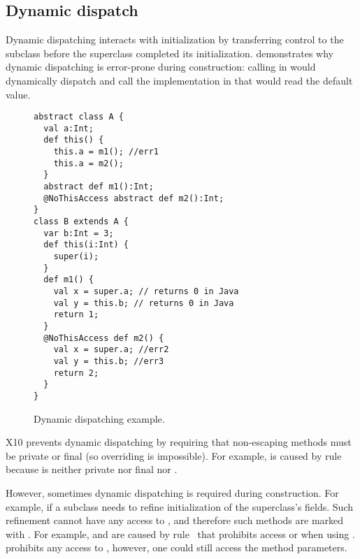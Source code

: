 \subsection{Dynamic dispatch}
Dynamic dispatching interacts with initialization by transferring control to the subclass
    before the superclass completed its initialization.
 demonstrates why dynamic dispatching is error-prone during construction:
    calling  in  would dynamically dispatch and
    call the implementation in 
    that would read the default value.



\begin{figure}
\begin{lstlisting}
abstract class A {
  val a:Int;
  def this() {
    this.a = m1(); //err1
    this.a = m2();
  }
  abstract def m1():Int;
  @NoThisAccess abstract def m2():Int;
}
class B extends A {
  var b:Int = 3;
  def this(i:Int) {
    super(i);
  }
  def m1() {
    val x = super.a; // returns 0 in Java
    val y = this.b; // returns 0 in Java
    return 1;
  }
  @NoThisAccess def m2() {
    val x = super.a; //err2
    val y = this.b; //err3
    return 2;
  }
}
\end{lstlisting}
\caption{Dynamic dispatching example.
    }
\label{Figure:Dynamic-dispatch}
\end{figure}


X10 prevents dynamic dispatching by requiring that non-escaping methods
    must be private or final
    (so overriding is impossible).
For example,  is caused by rule~
    because  is neither private nor final nor .

However, sometimes dynamic dispatching is required during construction.
For example, if a subclass needs to refine initialization
    of the superclass's fields.
Such refinement cannot have any access to \this, and therefore
    such methods are marked with .
For example,  and  are caused by rule~ that prohibits access \this or 
    when using .
 prohibits any access to \this,
    however, one could still access the method parameters.



